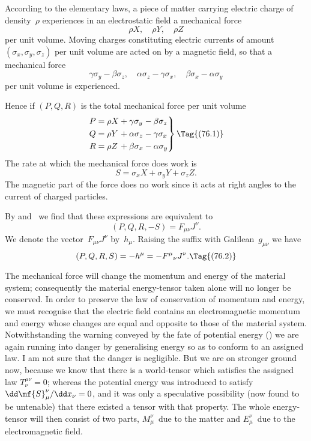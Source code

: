 \documentclass[12pt]{book}
\begin{document}

According to the elementary laws, a piece of matter carrying electric
charge of density~$\rho$ experiences in an electrostatic field a mechanical force
\[
\rho X,\quad \rho Y,\quad \rho Z
\]
per unit volume. Moving charges constituting electric currents of amount
$(\sigma_{x}, \sigma_{y}, \sigma_{z})$ per unit volume are acted on by a magnetic field, so that a
mechanical force
\[
\gamma\sigma_{y} - \beta\sigma_{z},\quad
\alpha\sigma_{z} - \gamma\sigma_{x},\quad
\beta\sigma_{x} - \alpha\sigma_{y}
\]
per unit volume is experienced.

Hence if $(P, Q, R)$ is the total mechanical force per unit volume
\[
\left.
\begin{alignedat}{3}
P &= \rho X &&+ \gamma \sigma_{y} &&- \beta \sigma_{z}\\
Q &= \rho Y &&+ \alpha \sigma_{z} &&- \gamma\sigma_{x}\\
R &= \rho Z &&+ \beta  \sigma_{x} &&- \alpha\sigma_{y}
\end{alignedat}
\right\}
\Tag{(76.1)}
\]
The rate at which the mechanical force does work is
\[
S = \sigma_{x} X + \sigma_{y} Y + \sigma_{z} Z.
\]
The magnetic part of the force does no work since it acts at right angles to
the current of charged particles.

By  and~ we find that these expressions are equivalent to
%
\[
(P, Q, R, -S) = F_{\mu\nu} J^{\nu}.
\]
We denote the vector~$F_{\mu\nu} J^{\nu}$ by~$h_{\mu}$. Raising the suffix with Galilean~$g_{\mu\nu}$ we
have
\[
(P, Q, R, S) = -h^{\mu} = -{F^{\mu}}_{\nu} J^{\nu}.
\Tag{(76.2)}
\]

The mechanical force will change the momentum and energy of the
material system; consequently the material energy-tensor taken alone will
%
no longer be conserved. In order to preserve the law of conservation of
momentum and energy, we must recognise that the electric field contains an
electromagnetic momentum and energy whose changes are equal and opposite
%
to those of the material system\footnotemark.\footnotetext
  {Notwithstanding the warning conveyed by the fate of potential energy () we are again
  running into danger by generalising energy so as to conform to an assigned law. I am not sure
  that the danger is negligible. But we are on stronger ground now, because we know that there is a
  world-tensor which satisfies the assigned law $T_{\nu}^{\mu\nu} = 0$; whereas the potential energy was introduced
  to satisfy $\dd\mf{S}_{\mu}^{\nu}/\dd x_{\nu} = 0$, and it was only a speculative possibility (now found to be untenable) that
  there existed a tensor with that property.}
The whole energy-tensor will then consist
of two parts, $M_{\mu}^{\nu}$~due to the matter and $E_{\mu}^{\nu}$~due to the electromagnetic field.
\end{document}

